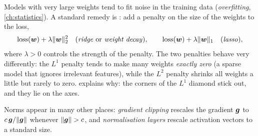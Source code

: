 \begin{mlnote}
Models with very large weights tend to fit noise in the training data
(\emph{overfitting}, \cref{ch:statistics}). A standard remedy is
: add a penalty on the size of the weights to the loss,
\[
  \text{loss}(\bm{w}) + \lambda\lVert\bm{w}\rVert_2^2
  \quad\text{(\emph{ridge} or \emph{weight decay})},
  \qquad
  \text{loss}(\bm{w}) + \lambda\lVert\bm{w}\rVert_1
  \quad\text{(\emph{lasso})},
\]
where $\lambda > 0$ controls the strength of the penalty. The two penalties
behave very differently: the $L^1$ penalty tends to make many weights
\emph{exactly zero} (a sparse model that ignores irrelevant features), while
the $L^2$ penalty shrinks all weights a little but rarely to zero.
 explains why: the corners of the $L^1$ diamond stick out, and
they lie on the axes.

Norms appear in many other places: \emph{gradient clipping} rescales the
gradient $\bm{g}$ to $c\,\bm{g}/\lVert\bm{g}\rVert$ whenever $\lVert\bm{g}\rVert > c$, and
\emph{normalisation layers} rescale activation vectors to a standard size.
\end{mlnote}

